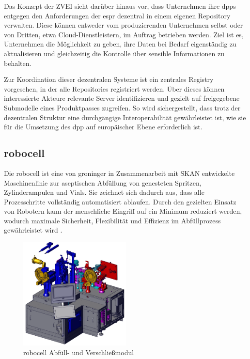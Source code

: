 Das Konzept der ZVEI sieht darüber hinaus vor, dass Unternehmen ihre \acsp{dpp} entgegen den Anforderungen der \acs{espr} dezentral in einem eigenen Repository verwalten. 
Diese können entweder vom produzierenden Unternehmen selbst oder von Dritten, etwa Cloud-Dienstleistern, im Auftrag betrieben werden. 
Ziel ist es, Unternehmen die Möglichkeit zu geben, ihre Daten bei Bedarf eigenständig zu aktualisieren und gleichzeitig die Kontrolle über sensible Informationen zu behalten.

Zur Koordination dieser dezentralen Systeme ist ein zentrales Registry vorgesehen, in der alle Repositories registriert werden.
Über dieses können interessierte Akteure relevante Server identifizieren und gezielt auf freigegebene Submodelle eines Produktpasses zugreifen.
So wird sichergestellt, dass trotz der dezentralen Struktur eine durchgängige Interoperabilität gewährleistet ist, wie sie für die Umsetzung des \acs{dpp} auf europäischer Ebene erforderlich ist.

\subsection{robocell}
Die robocell ist eine von groninger in Zusammenarbeit mit SKAN entwickelte Maschinenlinie zur aseptischen Abfüllung von genesteten Spritzen, Zylinderampulen und Vials.
Sie zeichnet sich dadurch aus, dass alle Prozesschritte vollständig automatisiert ablaufen.
Durch den gezielten Einsatz von Robotern kann der menschliche Eingriff auf ein Minimum reduziert werden, wodurch maximale Sicherheit, Flexibilität und Effizienz im Abfüllprozess gewährleistet wird \cite{RobocellWebsite}.

\begin{figure}[htbp]
    \centering
    \includegraphics[width=0.5\textwidth]{Bilder/robocell/filling_closing_module.png}
    \caption{robocell Abfüll- und Verschließmodul \cite{RobocellBetriebsanleitung}}
    \label{fig:robocell}
\end{figure}

